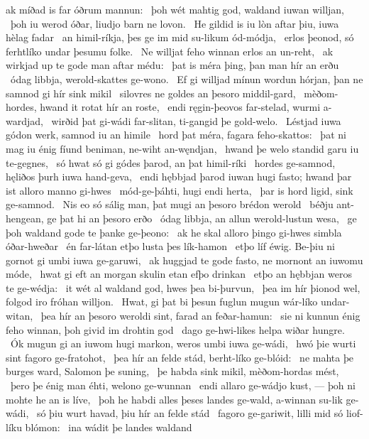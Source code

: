 ak míðad is far óðrum mannun: \hld\ þoh wét mahtig god,
waldand iuwan willjan, \hld\ þoh iu werod óðar,
liudjo barn ne lovon. \hld\ He gildid is iu lòn aftar þiu,
iuwa hèlag fadar \hld\ an himil-ríkja,
þes ge im mid su-likum ód-módja, \hld\ erlos þeonod,
só ferhtlíko undar þesumu folke. \hld\ Ne willjat feho winnan
erlos an un-reht, \hld\ ak wirkjad up te gode
man aftar médu: \hld\ þat is méra þing,
þan man hír an erðu \hld\ ódag libbja,
werold-skattes ge-wono. \hld\ Ef gi willjad mínun wordun hórjan,
þan ne samnod gi hír sink mikil \hld\ silovres ne goldes
an þesoro middil-gard, \hld\ mèðom-hordes,
hwand it rotat hír an roste, \hld\ endi ręgin-þeovos far-stelad,
wurmi a-wardjad, \hld\ wirðid þat gi-wádi far-slitan,
ti-gangid þe gold-welo. \hld\ Léstjad iuwa gódon werk,
samnod iu an himile \hld\ hord þat méra,
fagara feho-skattos: \hld\ þat ni mag iu énig fíund beniman,
ne-wiht an-węndjan, \hld\ hwand þe welo standid
garu iu te-gegnes, \hld\ só hwat só gi gódes þarod,
an þat himil-ríki \hld\ hordes ge-samnod,
hęliðos þurh iuwa hand-geva, \hld\ endi hębbjad þarod iuwan hugi fasto;
hwand þar ist alloro manno gi-hwes \hld\ mód-ge-þáhti,
hugi endi herta, \hld\ þar is hord ligid,
sink ge-samnod. \hld\ Nis eo só sálig man,
þat mugi an þesoro brédon werold \hld\ béðju ant-hengean,
ge þat hi an þesoro erðo \hld\ ódag libbja,
an allun werold-lustun wesa, \hld\ ge þoh waldand gode
te þanke ge-þeono: \hld\ ak he skal alloro þingo gi-hwes
simbla óðar-hweðar \hld\ én far-látan
etþo lusta þes lík-hamon \hld\ etþo líf éwig.
Be-þiu ni gornot gi umbi iuwa ge-garuwi, \hld\ ak huggjad te gode fasto,
ne mornont an iuwomu móde, \hld\ hwat gi eft an morgan skulin
etan efþo drinkan \hld\ etþo an hębbjan
weros te ge-wédja: \hld\ it wét al waldand god,
hwes þea bi-þurvun, \hld\ þea im hír þionod wel,
folgod iro fróhan willjon. \hld\ Hwat, gi þat bi þesun fuglun mugun
wár-líko undar-witan, \hld\ þea hír an þesoro weroldi sint,
farad an feðar-hamun: \hld\ sie ni kunnun énig feho winnan,
þoh givid im drohtin god \hld\ dago ge-hwi-likes
helpa wiðar hungre. \hld\ Ók mugun gi an iuwom hugi markon,
weros umbi iuwa ge-wádi, \hld\ hwó þie wurti sint
fagoro ge-fratohot, \hld\ þea hír an felde stád,
berht-líko ge-blóid: \hld\ ne mahta þe burges ward,
Salomon þe suning, \hld\ þe habda sink mikil,
mèðom-hordas mést, \hld\ þero þe énig man éhti,
welono ge-wunnan \hld\ endi allaro ge-wádjo kust, —
þoh ni mohte he an is líve, \hld\ þoh he habdi alles þeses landes ge-wald,
a-winnan su-lik ge-wádi, \hld\ só þiu wurt havad,
þiu hír an felde stád \hld\ fagoro ge-gariwit,
lilli mid só liof-líku blómon: \hld\ ina wádit þe landes waldand
